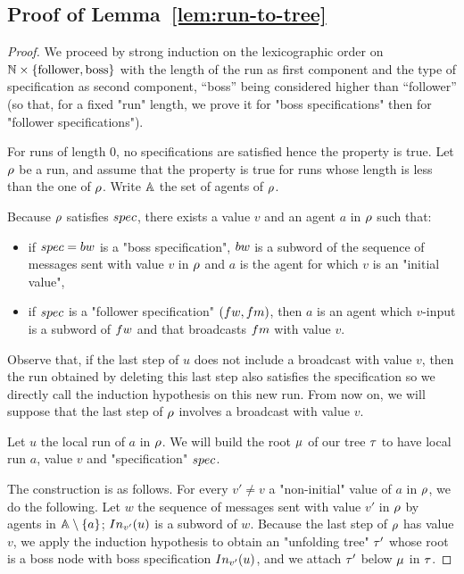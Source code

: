 \subsection{Proof of Lemma~\ref{lem:run-to-tree}}

\LemRunToTree*

\begin{proof}
	
	We proceed by strong induction on the lexicographic order on $\mathbb{N} \times \{\text{follower}, \text{boss}\}$ with the length of the run as first component and the type of specification as second component, ``boss'' being considered higher than ``follower'' (so that, for a fixed "run" length, we prove it for "boss specifications" then for "follower specifications"). 
	
	For runs of length $0$, no specifications are satisfied hence the property is true.
	Let $\rho$ be a run, and assume that the property is true for runs whose length is less than the one of $\rho$. Write $\mathbb{A}$ the set of agents of $\rho$.
	
	Because $\rho$ satisfies $\spec$, there exists a value $v$ and an agent $a$ in $\rho$ such that:
	\begin{itemize}
	\item if $\spec= \bossspec$ is a "boss specification", $\bossspec$ is a subword of the sequence of messages sent with value $v$ in $\rho$ and $a$ is the agent for which $v$ is an "initial value",
	\item if $\spec$ is a "follower specification" $(\followwordspec, \followmessagespec)$, then $a$ is an agent which $v$-input is a subword of $\followwordspec$ and that broadcasts $\followmessagespec$ with value $v$. 
	\end{itemize}

	Observe that, if the last step of $u$ does not include a broadcast with value $v$, then the run obtained by deleting this last step also satisfies the specification so we directly call the induction hypothesis on this new run. From now on, we will suppose that the last step of $\rho$ involves a broadcast with value $v$. 

	Let $u$ the local run of $a$ in $\rho$. We will build the root $\mu$ of our tree $\tau$ to have local run $a$, value $v$ and "specification" $\spec$. 

	The construction is as follows.
	For every $v' \ne v$ a "non-initial" value of $a$ in $\rho$, we do the following. Let $w$ the sequence of messages sent with value $v'$ in $\rho$ by agents in $\mathbb{A} \setminus \{a\}$; $\vinput{v'}{u}$ is a subword of $w$. Because the last step of $\rho$ has value $v$, we apply the induction hypothesis to obtain an "unfolding tree" $\tau'$ whose root is a boss node with boss specification $\vinput{v'}{u}$, and we attach $\tau'$ below $\mu$ in $\tau$.



\end{proof}
